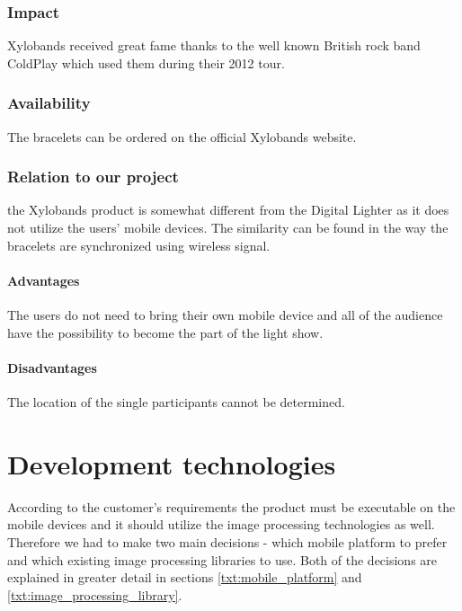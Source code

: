 \subsubsection{Impact}
Xylobands received great fame thanks to the well known British rock band ColdPlay which used them during their 2012 tour.

\subsubsection{Availability}
The bracelets can be ordered on the official Xylobands website.

\subsubsection{Relation to our project}
the Xylobands product is somewhat different from the Digital Lighter as it does not utilize the users' mobile devices. 
The similarity can be found in the way the bracelets are synchronized using wireless signal. 

\paragraph{Advantages}
The users do not need to bring their own mobile device and all of the audience have the possibility to become the part of the light show.

\paragraph{Disadvantages}
The location of the single participants cannot be determined.


\section{Development technologies} \label{txt:development technologies}

According to the customer's requirements the product must be executable on the mobile devices and it should utilize the image processing technologies as well. Therefore we had to make two main decisions - which mobile platform to prefer and which existing image processing libraries to use. Both of the decisions are explained in greater detail in sections \ref{txt:mobile_platform} and \ref{txt:image_processing_library}.

